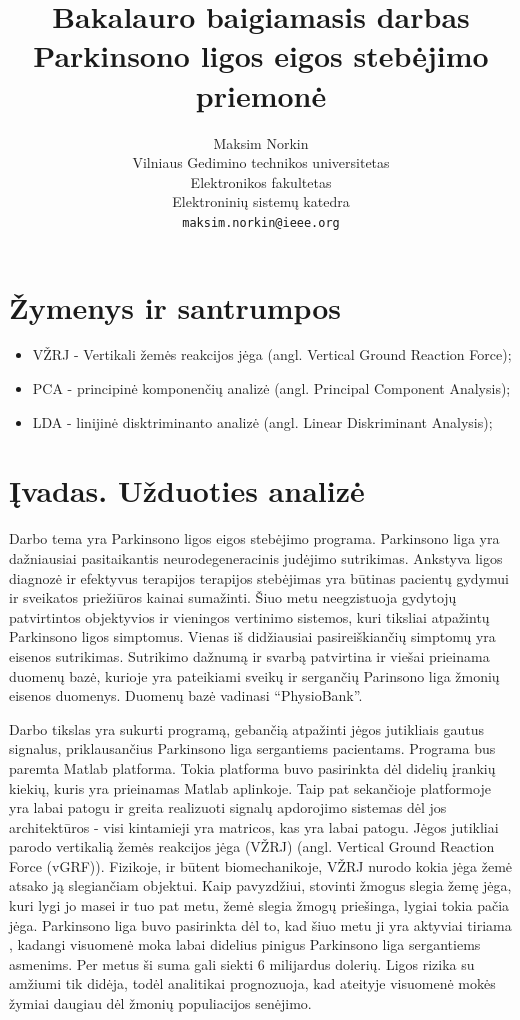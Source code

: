 \documentclass[]{vgtuef}
\author{Maksim Norkin\\Vilniaus Gedimino technikos
  universitetas\\Elektronikos fakultetas\\Elektroninių sistemų
  katedra\\\texttt{maksim.norkin@ieee.org}}
\title{Bakalauro baigiamasis darbas\\Parkinsono ligos eigos stebėjimo priemonė}
\begin{document}
\setcounter{page}{7}

\onehalfspacing

\tableofcontents

\section*{Žymenys ir santrumpos}

\begin{itemize}
\item VŽRJ - Vertikali žemės reakcijos jėga (angl. Vertical Ground Reaction Force);
\item PCA - principinė komponenčių analizė (angl. Principal Component Analysis);
\item LDA - linijinė disktriminanto analizė (angl. Linear Diskriminant Analysis);
\end{itemize}


\section{Įvadas. Užduoties analizė}

Darbo tema yra Parkinsono ligos eigos stebėjimo programa. Parkinsono liga yra dažniausiai pasitaikantis neurodegeneracinis judėjimo sutrikimas. Ankstyva ligos diagnozė ir efektyvus terapijos terapijos stebėjimas yra būtinas pacientų gydymui ir sveikatos priežiūros kainai sumažinti. Šiuo metu neegzistuoja gydytojų patvirtintos objektyvios ir vieningos vertinimo sistemos, kuri tiksliai atpažintų Parkinsono ligos simptomus. Vienas iš didžiausiai pasireiškiančių simptomų yra eisenos sutrikimas. Sutrikimo dažnumą ir svarbą patvirtina ir viešai prieinama duomenų bazė, kurioje yra pateikiami sveikų ir sergančių Parinsono liga žmonių eisenos duomenys. Duomenų bazė vadinasi ``PhysioBank''.

Darbo tikslas yra sukurti programą, gebančią atpažinti jėgos jutikliais gautus signalus, priklausančius Parkinsono liga sergantiems pacientams. Programa bus paremta Matlab platforma. Tokia platforma buvo pasirinkta dėl didelių įrankių kiekių, kuris yra prieinamas Matlab aplinkoje. Taip pat sekančioje platformoje yra labai patogu ir greita realizuoti signalų apdorojimo sistemas dėl jos architektūros - visi kintamieji yra matricos, kas yra labai patogu. Jėgos jutikliai parodo vertikalią žemės reakcijos jėga (VŽRJ) (angl. Vertical Ground Reaction Force (vGRF)). Fizikoje, ir būtent biomechanikoje, VŽRJ nurodo kokia jėga žemė atsako ją slegiančiam objektui. Kaip pavyzdžiui, stovinti žmogus slegia žemę jėga, kuri lygi jo masei ir tuo pat metu, žemė slegia žmogų priešinga, lygiai tokia pačia jėga. Parkinsono liga buvo pasirinkta dėl to, kad šiuo metu ji yra aktyviai tiriama \cite{vgtu}, kadangi visuomenė moka labai didelius pinigus Parkinsono liga sergantiems asmenims. Per metus ši suma gali siekti 6 milijardus dolerių. Ligos rizika su amžiumi tik didėja, todėl analitikai prognozuoja, kad ateityje visuomenė mokės žymiai daugiau dėl žmonių populiacijos senėjimo.
\end{document}
